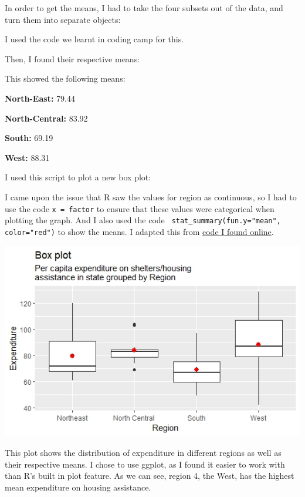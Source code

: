\documentclass[12pt,letterpaper]{article}
\begin{document}
\begin{itemize}
In order to get the means, I had to take the four subsets out of the data, and turn them into separate objects:

I used the code we learnt in coding camp for this.

Then, I found their respective means:


This showed the following means:

\textbf{North-East:} 79.44

\textbf{North-Central:} 83.92

\textbf{South:} 69.19

\textbf{West:} 88.31

\newpage
I used this script to plot a new box plot:


I came upon the issue that R saw the values for region as continuous, so I had to use the code \texttt{x = factor} to ensure that these values were categorical when plotting the graph. And I also used the code \texttt{ stat\_summary(fun.y="mean", color="red")} to show the means. I adapted this from  \href{https://www.geeksforgeeks.org/how-to-show-mean-value-in-boxplots-with-ggplot2/}{code I found online}.

\includegraphics{RegionEx}

This plot shows the distribution of expenditure in different regions as well as their respective means. I chose to use ggplot, as I found it easier to work with than R's built in plot feature.
As we can see, region 4, the West, has the highest mean expenditure on housing assistance.




\end{itemize}
\end{document}
